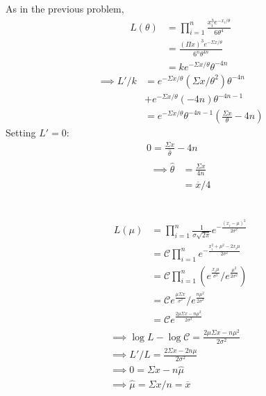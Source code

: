 \documentclass[twocolumn]{article}
\numberwithin{equation}{section}
\begin{document}
As in the previous problem,
\begin{align*}
L(\theta)&=\prod_{i=1}^n\frac{x_i^3e^{-x_i/\theta}}{6\theta^4}\\
&=\frac{(\Pi x)^3e^{-\Sigma x/\theta}}{6^n\theta^{4n}}\\
&=ke^{-\Sigma x/\theta}\theta^{-4n}
\end{align*}
\begin{align*}
\implies L'/k&=e^{-\Sigma x/\theta}\left(\Sigma x/\theta^2\right)\theta^{-4n}\\
&+e^{-\Sigma x/\theta}(-4n)\theta^{-4n-1}\\
&=e^{-\Sigma x/\theta}\theta^{-4n-1}\left(\frac{\Sigma x}{\theta}-4n\right)
\end{align*}
Setting $L'=0$:
\begin{gather*}
0=\frac{\Sigma x}{\hat{\theta}}-4n\\
\begin{aligned}
\implies \hat{\theta}&=\frac{\Sigma x}{4n}\\
&=\overline{x}/4
\end{aligned}
\end{gather*}

\subsection{}\begin{gather*}
\begin{aligned}
L(\mu)&=\prod_{i=1}^n\frac{1}{\sigma\sqrt{2\pi}}e^{-\frac{(x_i-\mu)^2}{2\sigma^2}}\\
&=\mathcal{C}\prod_{i=1}^ne^{-\frac{x_i^2+\mu^2-2x_i\mu}{2\sigma^2}}\\
&=\mathcal{C}\prod_{i=1}^n(e^{\frac{x_i\mu}{\sigma^2}}/e^{\frac{\mu^2}{2\sigma^2}})\\
&=\mathcal{C}e^{\frac{\mu\Sigma x}{\sigma^2}}/e^{\frac{n\mu^2}{2\sigma^2}}\\
&=\mathcal{C}e^\frac{2\mu\Sigma x-n\mu^2}{2\sigma^2}
\end{aligned}\\
\implies \log L-\log\mathcal{C}=\frac{2\mu\Sigma x-n\mu^2}{2\sigma^2}\\
\implies L'/L=\frac{2\Sigma x- 2n\mu}{2\sigma^2}\\
\implies 0=\Sigma x-n\hat{\mu}\\
\implies \hat{\mu}=\Sigma x/n=\overline{x}
\end{gather*}
\end{document}
